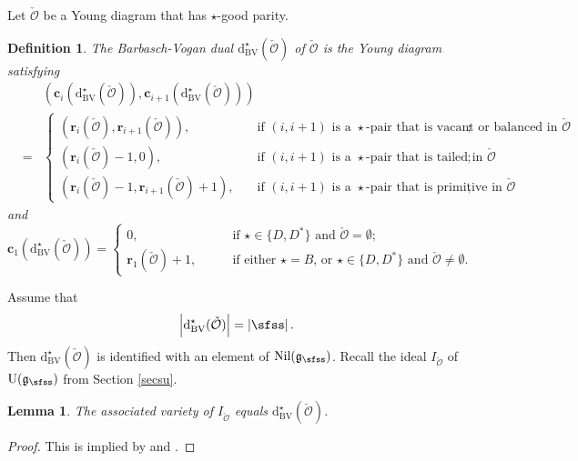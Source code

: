 \documentclass[12pt,a4paper]{amsart}
\def\abs#1{\left|{#1}\right|}
\newcommand{\CO}{{\mathcal {O}}}
\newcommand{\oU}{\operatorname{U}}
\newcommand{\g}{\mathfrak g}
\numberwithin{equation}{section}
\newtheorem{lem}[thm]{Lemma}
\newtheorem{defn}[thm]{Definition}
\theoremstyle{remark}
\begin{document}
Let $\check \CO$ be a Young diagram that has $\star$-good parity.

\begin{defn}\label{bvdual0}
The  Barbasch-Vogan dual $\mathrm d_{\mathrm{BV}}^\star(\check \CO)$ of $\check \CO$ is the Young diagram satisfying
\begin{eqnarray*}
 &&\left (\mathbf c_i(\mathrm d_{\mathrm{BV}}^\star(\check \CO)), \mathbf c_{i+1}(\mathrm d_{\mathrm{BV}}^\star(\check \CO))\right )\\
  &=&\begin{cases}
      (\mathbf r_i(\check \CO), \mathbf r_{i+1}(\check \CO)),\quad& \textrm{if  $(i,i+1)$ is a $\star$-pair that is vacant or balanced in $\check \CO$};  \\
        (\mathbf r_i(\check \CO)-1, 0),\quad& \textrm{if  $(i,i+1)$ is a $\star$-pair that is  tailed in $\check \CO$};  \\
         (\mathbf r_i(\check \CO)-1, \mathbf r_{i+1}(\check \CO)+1),\quad& \textrm{if  $(i,i+1)$ is a $\star$-pair that is primitive in $\check \CO$},  
  \end{cases}
  \end{eqnarray*}
and 
\[
    \mathbf c_1(\mathrm d_{\mathrm{BV}}^\star(\check \CO))=\begin{cases}
      0,\qquad& \textrm{if  $\star\in \{D, D^*\}$ and $\check \CO=\emptyset$};  \\
       \mathbf r_1(\check \CO)+1, \qquad& \textrm{if  either $\star=B$, or $\star\in \{D, D^*\}$ and $\check \CO\neq \emptyset$.}  
          \end{cases}
\]

\end{defn}

Assume that 
\[
 \abs{\mathrm d_{\mathrm{BV}}^\star(\check \CO)}=\abs{\sfss}.
\]
Then  $\mathrm d_{\mathrm{BV}}^\star(\check \CO)$ is identified with an element of $\mathrm{Nil}(\g_\sfss)$. 
Recall  the ideal $I_{\check \CO}$ of $\oU(\g_\sfss)$ from Section \ref{secsu}.


\begin{lem}\label{bvdual}
The  associated variety of $I_{\check \CO}$ equals   $\mathrm d_{\mathrm{BV}}^\star(\check \CO)$.
\end{lem}
\begin{proof}
This is implied by \cite[Corollary A3]{BVUni} and \cite[Theorem B]{BMSZ1}. 
\end{proof}
\end{document}
